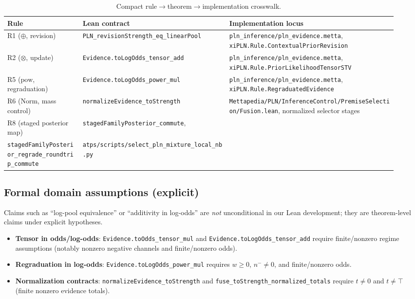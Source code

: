 \documentclass[11pt]{article}
\newcommand{\lpath}[1]{\texttt{\nolinkurl{#1}}}
\newcommand{\lid}[1]{{\ttfamily\nolinkurl{#1}}}
\begin{document}
\begin{table}[h]
\centering
\begin{scriptsize}
\begin{tabular}{@{}L{0.18\linewidth}L{0.35\linewidth}L{0.40\linewidth}@{}}
\toprule
\textbf{Rule} & \textbf{Lean contract} & \textbf{Implementation locus} \\
\midrule
R1 (\(\oplus\), revision) &
\lid{PLN_revisionStrength_eq_linearPool} &
\lpath{pln_inference/pln_evidence.metta}, \lid{xiPLN.Rule.ContextualPriorRevision} \\
R2 (\(\otimes\), update) &
\lid{Evidence.toLogOdds_tensor_add} &
\lpath{pln_inference/pln_evidence.metta}, \lid{xiPLN.Rule.PriorLikelihoodTensorSTV} \\
R5 (\(\mathrm{pow}\), regraduation) &
\lid{Evidence.toLogOdds_power_mul} &
\lpath{pln_inference/pln_evidence.metta}, \lid{xiPLN.Rule.RegraduatedEvidence} \\
R6 (\(\mathrm{Norm}\), mass control) &
\lid{normalizeEvidence_toStrength} &
\lpath{Mettapedia/PLN/InferenceControl/PremiseSelection/Fusion.lean}, normalized selector stages \\
R8 (staged posterior map) &
\lid{stagedFamilyPosterior_commute},\\
\lid{stagedFamilyPosterior_regrade_roundtrip_commute} &
\lpath{atps/scripts/select_pln_mixture_local_nb.py} \\
\bottomrule
\end{tabular}
\end{scriptsize}
\caption{Compact rule$\rightarrow$theorem$\rightarrow$implementation crosswalk.}
\label{tab:rule-crosswalk}
\end{table}

\subsection{Formal domain assumptions (explicit)}
Claims such as ``log-pool equivalence'' or ``additivity in log-odds'' are
\emph{not} unconditional in our Lean development; they are theorem-level claims
under explicit hypotheses.
\begin{itemize}
\item \textbf{Tensor in odds/log-odds}:
      \lid{Evidence.toOdds_tensor_mul} and
      \lid{Evidence.toLogOdds_tensor_add} require finite/nonzero regime
      assumptions (notably nonzero negative channels and finite/nonzero odds).
\item \textbf{Regraduation in log-odds}:
      \lid{Evidence.toLogOdds_power_mul} requires \(w \ge 0\), \(n^- \neq 0\),
      and finite/nonzero odds.
\item \textbf{Normalization contracts}:
      \lid{normalizeEvidence_toStrength} and
      \lid{fuse_toStrength_normalized_totals} require \(t \neq 0\) and
      \(t \neq \top\) (finite nonzero evidence totals).
\end{itemize}
\end{document}
